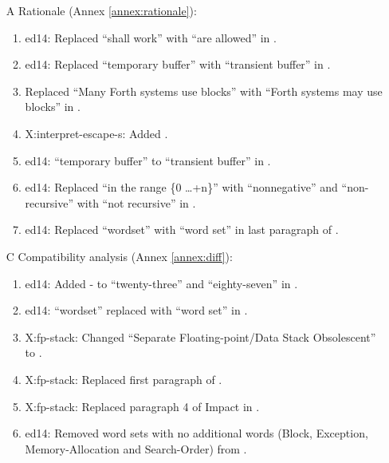 \begin{itemize}
	\item[A] Rationale (Annex \ref{annex:rationale}):				%
		\begin{enumerate}
		\item \textsf{ed14}: Replaced ``shall work'' with ``are allowed'' in
			.
		\item \textsf{ed14}: Replaced ``temporary buffer'' with ``transient buffer'' in .
		\item Replaced ``Many Forth systems use blocks'' with ``Forth systems may use blocks'' in .
		\item \textsf{X:interpret-escape-s}: Added .
		\item \textsf{ed14}: ``temporary buffer'' to ``transient buffer'' in
			.
		\item \textsf{ed14}: Replaced ``in the range \{0 \ldots +n\}'' with
			``nonnegative'' and ``non-recursive'' with ``not recursive'' in
			.
		\item \textsf{ed14}: Replaced ``wordset'' with ``word set'' in last paragraph
			of .
		\end{enumerate}


	\item[C] Compatibility analysis (Annex \ref{annex:diff}):			%
		\begin{enumerate}
		\item \textsf{ed14}: Added - to ``twenty-three'' and ``eighty-seven''
			in .
		\item \textsf{ed14}: ``wordset'' replaced with ``word set'' in .
		\item \textsf{X:fp-stack}: Changed ``Separate Floating-point/Data Stack Obsolescent'' to .
		\item \textsf{X:fp-stack}: Replaced first paragraph of .
		\item \textsf{X:fp-stack}: Replaced paragraph 4 of Impact in .
		\item \textsf{ed14}: Removed word sets with no additional words
		(Block, Exception, Memory-Allocation and Search-Order)
		from .
		\end{enumerate}
		

\end{itemize}
